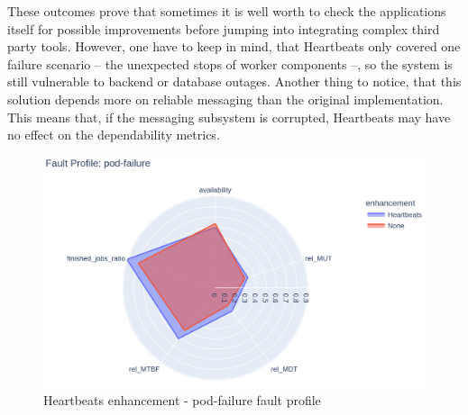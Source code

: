 These outcomes prove that sometimes it is well worth to check the applications itself for possible improvements before jumping into integrating complex third party tools. However, one have to keep in mind, that Heartbeats only covered one failure scenario -- the unexpected stops of worker components --, so the system is still vulnerable to backend or database outages. Another thing to notice, that this solution depends more on reliable messaging than the original implementation. This means that, if the messaging subsystem is corrupted, Heartbeats may have no effect on the dependability metrics.



\begin{figure}[H]
	\centering
	\includegraphics[width=140mm, keepaspectratio]{figures/heartbeats_with_base_pod-failure.png}
	\caption{Heartbeats enhancement - pod-failure fault profile}
	\label{fig:heartbeats-results-pod-failure}
\end{figure}

